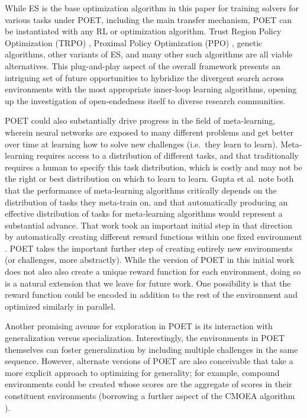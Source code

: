 \documentclass{article}
\newcommand{\jc}[1]{\comments{\textcolor{deepForestGreen}{[JC: #1]}}}
\newcommand{\comments}[1]{#1}
\begin{document}
While ES is the base optimization algorithm in this paper for training solvers for various tasks under POET, including the main transfer mechanism, POET can be instantiated with any RL or optimization algorithm.   Trust Region Policy Optimization (TRPO) \cite{schulman2015trust}, Proximal Policy Optimization (PPO) \cite{ppo:arxiv17}, genetic algorithms, other variants of ES, and many other such algorithms are all viable alternatives.
This plug-and-play aspect of the overall framework presents an intriguing set of future opportunities to hybridize the divergent search across environments with the most appropriate inner-loop learning algorithms, opening up the investigation of open-endedness itself to diverse research communities.

POET could also substantially drive progress in the field of meta-learning, wherein neural networks are exposed to many different problems and get better over time at learning how to solve new challenges (i.e.\ they learn to learn). Meta-learning requires access to a distribution of different tasks, and that traditionally requires a human to specify this task distribution, which is costly and may not be the right or best distribution on which to learn to learn. Gupta et al. \cite{gupta2018unsupervised} note both that the performance of meta-learning algorithms critically depends on the distribution of tasks they meta-train on, and that automatically producing an effective distribution of tasks for meta-learning algorithms would represent a substantial advance. That work took an important initial step in that direction by automatically creating different reward functions within one fixed environment \cite{gupta2018unsupervised}. POET takes the important further step of creating entirely new environments (or challenges, more abstractly). While the version of POET in this initial work does not also also create a unique reward function for each environment, doing so is a natural extension that we leave for future work. One possibility is that the reward function could be encoded in addition to the rest of the environment and optimized similarly in parallel.  

Another promising avenue for exploration in POET is its interaction with generalization versus specialization.  Interestingly, the environments in POET themselves can foster generalization by including multiple challenges in the same sequence.  However, alternate versions of POET are also conceivable that take a more explicit approach to optimizing for generality; for example, compound environments could be created whose scores are the aggregate of scores in their constituent environments (borrowing a further aspect of the CMOEA algorithm \cite{huizinga2016does, Joost:arxiv18}).  
\end{document}
